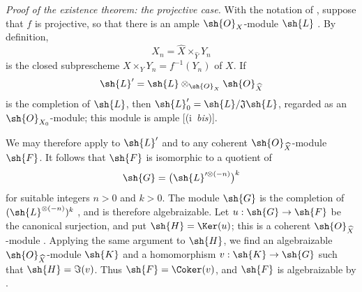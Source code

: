 \begin{env}[5.2.5]
\label{III.5.2.5}
\emph{Proof of the existence theorem: the projective case.}
With the notation of , suppose that $f$ is
projective, so that there is an ample $\sh{O}_X$-module $\sh{L}$
.  By definition,
\[
  X_n=\widehat{X}\times_{\widehat{Y}}Y_n
\]
is the closed subprescheme
$X\times_Y Y_n=f^{-1}(Y_n)$ of $X$.  If
\[
  \sh{L}'=\sh{L}\otimes_{\sh{O}_X}\sh{O}_{\widehat{X}}
\]
is the completion of $\sh{L}$, then
$\sh{L}'_0=\sh{L}/\mathfrak{J}\sh{L}$, regarded as an
$\sh{O}_{X_0}$-module; this module is ample
[(i~\emph{bis})].

We may therefore apply  to $\sh{L}'$ and to any
coherent $\sh{O}_{\widehat{X}}$-module $\sh{F}$.  It follows that
$\sh{F}$ is isomorphic to a quotient of
\[
  \sh{G}=
  \bigl(\sh{L}'^{\otimes(-n)}\bigr)^k
\]
for suitable integers $n>0$ and $k>0$.  The module $\sh{G}$ is the
completion of $(\sh{L}^{\otimes(-n)})^k$
, and is therefore algebraizable.  Let
$u:\sh{G}\to\sh{F}$ be the canonical surjection, and put
$\sh{H}=\Ker(u)$; this is a coherent
$\sh{O}_{\widehat{X}}$-module .  Applying the same
argument to $\sh{H}$, we find an algebraizable
$\sh{O}_{\widehat{X}}$-module $\sh{K}$ and a homomorphism
$v:\sh{K}\to\sh{G}$ such that $\sh{H}=\Im(v)$.  Thus
$\sh{F}=\Coker(v)$, and $\sh{F}$ is algebraizable by
.
\end{env}

